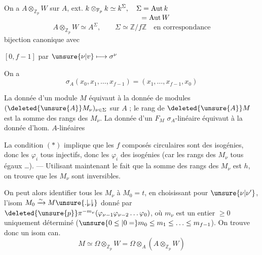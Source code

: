 On a $A\otimes_{\mathbb Z_p}W$  sur $A$, ext. 
$\begin{aligned}[t] k\otimes_{\mathbb F_p}k&\simeq k^\Sigma,\quad\Sigma=\operatorname{Aut} k\\[-2pt]&\hphantom{\simeq k^\Sigma,\quad\Sigma}=\operatorname{Aut} W\end{aligned}$
\[
A\otimes_{\mathbb Z_p}W\simeq A^\Sigma,\qquad \Sigma\simeq\mathbb Z/f\mathbb Z\quad\text{en correspondance}
\]
\hfill bijection canonique avec

\hfill $[0,f-1]$ par $\unsure{\nu|v}\longmapsto\sigma^\nu$

\hfill {}

On a
\[
\sigma_A(x_0,x_1,\ldots,x_{f-1})=(x_1,\ldots,x_{f-1},x_0)
\]

La donnée d'un module  $M$  équivaut à la donnée de modules $(\deleted{\unsure{A}}M_\nu)_{\nu\in\Sigma}$ sur $A$ ; le rang de $\deleted{\unsure{A}}M$ est la somme des rangs des $M_\nu$.  La donnée d'un  $F_M$ $\sigma_A$-linéaire équivaut à la donnée d'hom. $A$-linéaires

La condition $(*)$  implique que les $f$ composés circulaires sont des isogénies, donc les $\varphi_i$ tous injectifs, donc les $\varphi_i$ des isogénies (car les rangs des $M_\nu$ tous égaux \ldots).  --- Utilisant maintenant le fait que la somme des rangs des $M_\nu$ est $h$, on trouve que les $M_\nu$ sont inversibles.


On peut alors identifier tous les $M_\nu$ à   $M_0=t$,  en choisissant  pour  $\unsure{\nu|\nu'}$,
 l'isom $M_0\xrightarrow{\sim}M\unsure{.|\!{}_\nu|\!{}_{i}}$ donné par
$\deleted{\unsure{p}}\pi^{-m_\nu}(\varphi_{\nu-1}\varphi_{\nu-2}\ldots\varphi_0)$, où $m_\nu$ est un entier $\geq 0$ uniquement déterminé ($\unsure{0\leq|0=}m_0\leq m_1\leq\ldots\leq m_{f-1}$). On trouve donc un isom can.
\[
 M\simeq\Omega\otimes_{\mathbb Z_p} W=\Omega\otimes_A(A\otimes_{\mathbb Z_p}W)
\]
